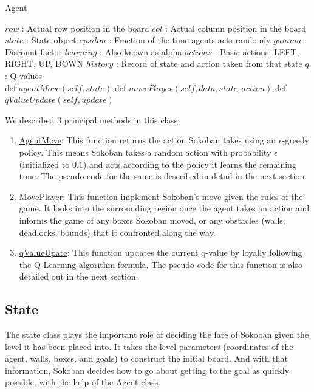 \documentclass{article}
\begin{document}
\begin{algorithm}
\caption{Agent}
\begin{algorithmic}
  \State $row$ : Actual row position in the board
  \State $col$ : Actual column position in the board
  \State $state$ : State object
  \State $epsilon$ : Fraction of the time agents acts randomly
  \State $gamma$ : Discount factor
  \State $learning$ : Also known as alpha
  \State $actions$ : Basic actions: LEFT, RIGHT, UP, DOWN
  \State $history$ : Record of state and action taken from that state
  \State $q$ : Q values \\
  
  \State def $agentMove(self, state)$
  \State def $movePlayer(self, data, state, action)$
  \State def $qValueUpdate(self, update)$
\EndStruct
\end{algorithmic}
\label{Class}
\end{algorithm}

We described 3 principal methods in this class:
    
\begin{enumerate}[label=\alph*)]
    \item \underline{AgentMove}: This function returns the action Sokoban takes using an $\epsilon$-greedy policy. This means Sokoban takes a random action with probability $\epsilon$ (initialized to $0.1$) and acts according to the policy it learns the remaining time. The pseudo-code for the same is described in detail in the next section.
    \item \underline{MovePlayer}: This function implement Sokoban's move given the rules of the game. It looks into the surrounding region once the agent takes an action and informs the game of any boxes Sokoban moved, or any obstacles (walls, deadlocks, bounds) that it confronted along the way. 
    \item \underline{qValueUpate}: This function updates the current q-value by loyally following the Q-Learning algorithm formula. The pseudo-code for this function is also detailed out in the next section. 
\end{enumerate}

\subsection{State}
The state class plays the important role of deciding the fate of Sokoban given the level it has been placed into. It takes the level parameters (coordinates of the agent, walls, boxes, and goals) to construct the initial board. And with that information, Sokoban decides how to go about getting to the goal as quickly possible, with the help of the Agent class. 
\end{document}
